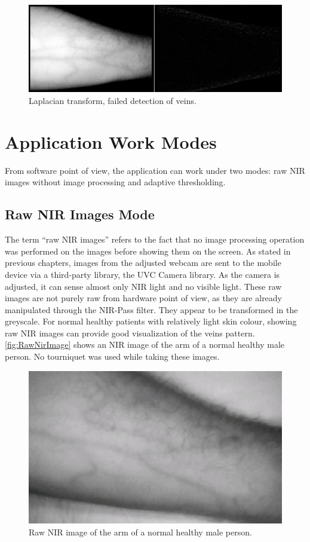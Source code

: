 \begin{figure}[H]
\centering
\includegraphics[scale=0.7]{figures/compare9.JPG}
\caption[Laplacian transform, failed detection of veins]{Laplacian transform, failed detection of veins.}\label{fig:Compare9}
\end{figure}


\section{Application Work Modes}
From software point of view, the application can work under two modes: raw NIR images without image processing and adaptive thresholding.

\subsection{Raw NIR Images Mode}

The term “raw NIR images” refers to the fact that no image processing operation was performed on the images before showing them on the screen. As stated in previous chapters, images from the adjusted webcam are sent to the mobile device via a third-party library, the UVC Camera library. As the camera is adjusted, it can sense almost only NIR light and no visible light. These raw images are not purely raw from hardware point of view, as they are already manipulated through the NIR-Pass filter. They appear to be transformed in the greyscale. For normal healthy patients with relatively light skin colour, showing raw NIR images can provide good visualization of the veins pattern. \autoref{fig:RawNirImage} shows an NIR image of the arm of a normal healthy male person. No tourniquet was used while taking these images.


\begin{figure}[H]
\centering
\includegraphics[scale=0.7]{figures/nir.JPG}
\caption[Raw NIR Image of an Arm with Good Vein Contrast]{Raw NIR image of the arm of a normal healthy male person.}\label{fig:RawNirImage}
\end{figure}

